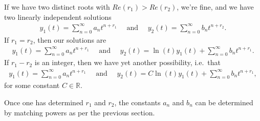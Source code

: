 \documentclass{book}
\begin{document}
If we have two distinct roots with $Re(r_1) > Re(r_2)$, we're fine, and we
have two linearly independent solutions
\begin{align}
\boxed{y_1(t) = \sum_{n=0}^\infty a_n t^{n+r_1}}
\quad\mbox{  and  }\quad
\boxed{y_2(t) = \sum_{n=0}^\infty b_n t^{n+r_2}}.
\end{align}
If $r_1=r_2$, then our solutions are
\begin{align}
\boxed{y_1(t) = \sum_{n=0}^\infty a_n t^{n+r_1}}
\quad\mbox{  and  }\quad
\boxed{y_2(t) = \ln(t) y_1(t) + \sum_{n=0}^\infty b_n t^{n+r_1}}.
\end{align}
If $r_1-r_2$ is an integer, then we have yet another possibility, i.e.\ that
\begin{align}
\boxed{y_1(t) = \sum_{n=0}^\infty a_n t^{n+r_1}}
\quad\mbox{  and  }\quad
\boxed{y_2(t) = C\ln(t) y_1(t) + \sum_{n=0}^\infty b_n t^{n+r_1}},
\end{align}
for some constant $C\in\mathbb{R}$.

Once one has determined $r_1$ and $r_2$, the constants $a_n$ and $b_n$ can
be determined by matching powers as per the previous section.
\end{document}
